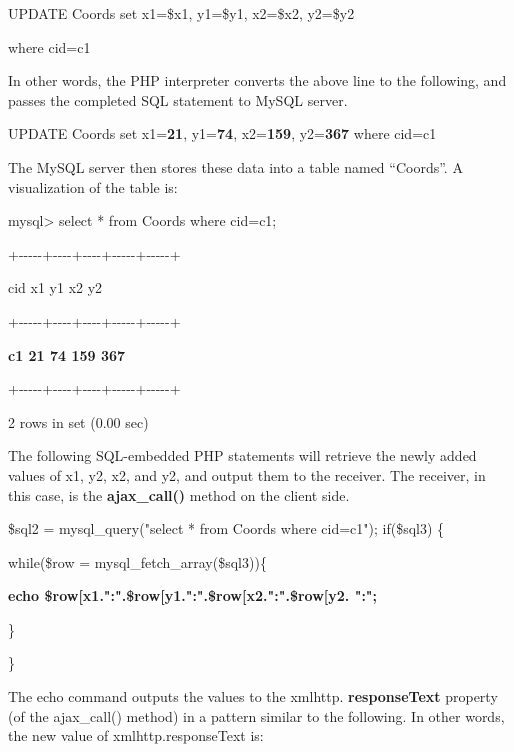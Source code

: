 \documentclass[
]{article}
\begin{document}
UPDATE Coords set x1=\textquotesingle\$x1\textquotesingle,
y1=\textquotesingle\$y1\textquotesingle,
x2=\textquotesingle\$x2\textquotesingle,
y2=\textquotesingle\$y2\textquotesingle{}

where cid=\textquotesingle c1\textquotesingle{}

In other words, the PHP interpreter converts the above line to the
following, and passes the completed SQL statement to MySQL server.

UPDATE Coords set x1=\textbf{21}, y1=\textbf{74}, x2=\textbf{159},
y2=\textbf{367} where cid=\textquotesingle c1\textquotesingle{}

The MySQL server then stores these data into a table named ``Coords''. A
visualization of the table is:

mysql\textgreater{} select * from Coords where
cid=\textquotesingle c1\textquotesingle;

+-\/-\/-\/-\/-+-\/-\/-\/-+-\/-\/-\/-+-\/-\/-\/-\/-+-\/-\/-\/-\/-+

\textbar{} cid \textbar{} x1 \textbar{} y1 \textbar{} x2 \textbar{} y2
\textbar{}

+-\/-\/-\/-\/-+-\/-\/-\/-+-\/-\/-\/-+-\/-\/-\/-\/-+-\/-\/-\/-\/-+

\textbar{} \textbf{c1 \textbar{} 21 \textbar{} 74 \textbar{} 159
\textbar{} 367} \textbar{}

+-\/-\/-\/-\/-+-\/-\/-\/-+-\/-\/-\/-+-\/-\/-\/-\/-+-\/-\/-\/-\/-+

2 rows in set (0.00 sec)

The following SQL-embedded PHP statements will retrieve the newly added
values of x1, y2, x2, and y2, and output them to the receiver. The
receiver, in this case, is the \textbf{ajax\_call()} method on the
client side.

\$sql2 = mysql\_query("select * from Coords where
cid=\textquotesingle c1\textquotesingle"); if(\$sql3) \{

while(\$row = mysql\_fetch\_array(\$sql3))\{

\textbf{echo
\$row{[}\textquotesingle x1\textquotesingle{]}.":".\$row{[}\textquotesingle y1\textquotesingle{]}.":".\$row{[}\textquotesingle x2\textquotesingle{]}.":".\$row{[}\textquotesingle y2\textquotesingle{]}.
":";}

\}

\}

The echo command outputs the values to the xmlhttp.
\textbf{responseText} property (of the ajax\_call() method) in a pattern
similar to the following. In other words, the new value of
xmlhttp.responseText is:
\end{document}
